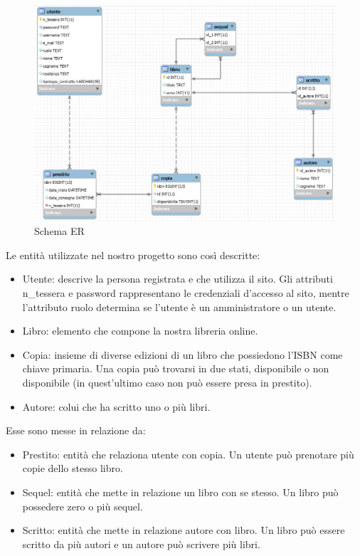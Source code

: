 \documentclass[a4paper,10pt]{article}
\begin{document}
\begin{figure}[H]
	\centering
	\includegraphics[width=0.8\linewidth]{images/ERdiagram}
	\caption[Schema ER]{Schema ER}
	\label{fig:re}
\end{figure}

Le entità utilizzate nel nostro progetto sono così descritte:

\begin{itemize}
	\item Utente: descrive la persona registrata e che utilizza il sito. Gli attributi n\_tessera e password rappresentano le credenziali d'accesso al sito, mentre l'attributo ruolo determina se l'utente è un amministratore o un utente.
	\item Libro: elemento che compone la nostra libreria online.
	\item Copia: insieme di diverse edizioni di un libro che possiedono l'ISBN come chiave primaria. Una copia può trovarsi in due stati, disponibile o non disponibile (in quest'ultimo caso non può essere presa in prestito).
	\item Autore: colui che ha scritto uno o più libri.
\end{itemize}

Esse sono messe in relazione da:
\begin{itemize}
	\item Prestito: entità che relaziona utente con copia. Un utente può prenotare più copie dello stesso libro.
	\item Sequel: entità che mette in relazione un libro con se stesso. Un libro può possedere zero o più sequel.
	\item Scritto: entità che mette in relazione autore con libro. Un libro può essere scritto da più autori e un autore può scrivere più libri.
\end{itemize}
\end{document}
